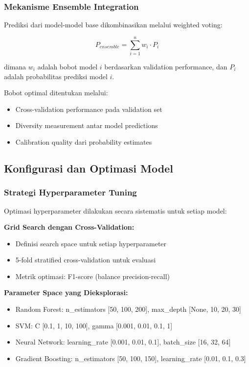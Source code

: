 \subsubsection{Mekanisme Ensemble Integration}
\label{sec:mekanismeIntegrasi}

Prediksi dari model-model base dikombinasikan melalui weighted voting:

\begin{equation}
P_{ensemble} = \sum_{i=1}^{n} w_i \cdot P_i
\end{equation}

dimana $w_i$ adalah bobot model $i$ berdasarkan validation performance, dan $P_i$ adalah probabilitas prediksi model $i$.

Bobot optimal ditentukan melalui:
\begin{itemize}
    \item Cross-validation performance pada validation set
    \item Diversity measurement antar model predictions
    \item Calibration quality dari probability estimates
\end{itemize}

\subsection{Konfigurasi dan Optimasi Model}
\label{subsec:konfigurasiOptimasi}

\subsubsection{Strategi Hyperparameter Tuning}
\label{sec:hyperparameterTuning}

Optimasi hyperparameter dilakukan secara sistematis untuk setiap model:

\textbf{Grid Search dengan Cross-Validation:}
\begin{itemize}
    \item Definisi search space untuk setiap hyperparameter
    \item 5-fold stratified cross-validation untuk evaluasi
    \item Metrik optimasi: F1-score (balance precision-recall)
\end{itemize}

\textbf{Parameter Space yang Dieksplorasi:}
\begin{itemize}
    \item Random Forest: n\_estimators [50, 100, 200], max\_depth [None, 10, 20, 30]
    \item SVM: C [0.1, 1, 10, 100], gamma [0.001, 0.01, 0.1, 1]
    \item Neural Network: learning\_rate [0.001, 0.01, 0.1], batch\_size [16, 32, 64]
    \item Gradient Boosting: n\_estimators [50, 100, 150], learning\_rate [0.01, 0.1, 0.3]
\end{itemize}

